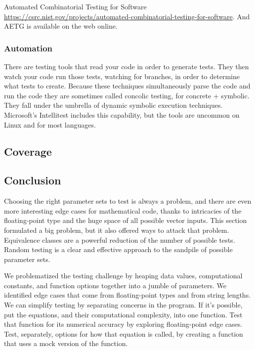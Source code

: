 \documentclass[fleqn,10pt]{olplainarticle}
\begin{document}
Automated Combinatorial Testing for Software
\url{https://csrc.nist.gov/projects/automated-combinatorial-testing-for-software}.
And AETG is available on the web online.

\subsubsection{Automation}

There are testing tools that read your code in order to
generate tests. They then watch your code run those tests,
watching for branches, in order to determine what tests
to create. Because these techniques simultaneously parse the
code and run the code they are sometimes called concolic testing,
for concrete + symbolic. They fall under the umbrella of
dynamic symbolic execution techniques. Microsoft's Intellitest
includes this capability, but the tools are uncommon on
Linux and for most languages.


\subsection{Coverage}

\subsection{Conclusion}

Choosing the right parameter sets to test is always a problem,
and there are even more interesting edge cases for mathematical
code, thanks to intricacies of the floating-point type and 
the huge space of all possible vector inputs. This section
formulated a big problem, but it also offered ways to attack
that problem. Equivalence classes are a powerful reduction of
the number of possible tests. Random testing is a clear and
effective approach to the sandpile of possible parameter sets.

We problematized the testing challenge by heaping data values,
computational constants, and function options together into
a jumble of parameters. We identified edge cases that come from
floating-point types and from string lengths. We can simplify
testing by separating concerns in the program. If it's possible,
put the equations, and their computational complexity, into
one function. Test that function for its numerical accuracy by
exploring floating-point edge cases. Test, separately,
options for how that equation is called, by creating a function
that uses a mock version of the function.
\end{document}
